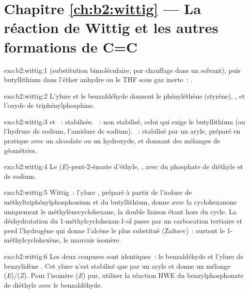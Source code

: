 \section*{Chapitre \ref{ch:b2:wittig} --- La réaction de Wittig et les autres formations de C=C}

\begin{solution}{exo:b2:wittig:1}
 (substitution bimoléculaire, par chauffage dans un solvant),
puis butyllithium dans l'éther anhydre ou le THF sous gaz inerte~: .
\end{solution}

\begin{solution}{exo:b2:wittig:2}
L'ylure  et le benzaldéhyde donnent le phényléthène (styrène), , et
l'oxyde de triphénylphosphine.
\end{solution}

\begin{solution}{exo:b2:wittig:3}
 et ~: stabilisés. ~: non stabilisé, celui qui exige
le butyllithium (ou l'hydrure de sodium, l'amidure de sodium). ~: stabilisé par un aryle,
préparé en pratique avec un alcoolate ou un hydroxyde, et donnant des mélanges de géométries.
\end{solution}

\begin{solution}{exo:b2:wittig:4}
Le (\textit{E})-pent-2-énoate d'éthyle, , avec du phosphate de diéthyle et de sodium.
\end{solution}

\begin{solution}{exo:b2:wittig:5}
Wittig~: l'ylure , préparé à partir de l'iodure de méthyltriphénylphosphonium et du
butyllithium, donne avec la cyclohexanone uniquement le méthylènecyclohexane, la double liaison étant
hors du cycle. La déshydratation du 1-méthylcyclohexan-1-ol passe par un carbocation tertiaire et perd
l'hydrogène qui donne l'alcène le plus substitué (Zaïtsev)~: surtout le 1-méthylcyclohexène, le mauvais isomère.
\end{solution}

\begin{solution}{exo:b2:wittig:6}
Les deux coupures sont identiques~: le benzaldéhyde et l'ylure de benzylidène . Cet ylure
n'est stabilisé que par un aryle et donne un mélange (\textit{E})/(\textit{Z}). Pour l'isomère (\textit{E})
pur, utiliser la réaction HWE du benzylphosphonate de diéthyle avec le benzaldéhyde.
\end{solution}

